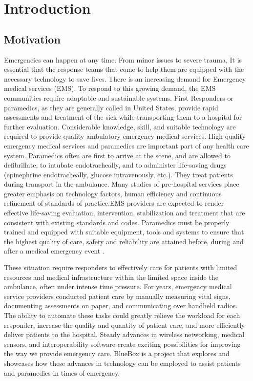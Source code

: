 \chapter{Introduction}
\section{Motivation}
\hspace{10mm} Emergencies can happen at any time. From minor issues to severe trauma, It is essential that the response teams that come to help them are equipped with the necessary technology to save lives. There is an increasing demand for Emergency medical services (EMS). To respond to this growing demand, the EMS communities require adaptable and sustainable systems. First Responders or paramedics, as they are generally called in United States, provide rapid assessments and treatment of the sick while transporting them to a hospital for further evaluation. Considerable knowledge, skill, and suitable technology are required to provide quality ambulatory emergency medical services. High quality emergency medical services and paramedics are important part of any health care system. Paramedics often are first to arrive at the scene, and  are allowed to defibrillate, to intubate endotracheally, and to administer life-saving drugs (epinephrine endotracheally, glucose intravenously, etc.). They treat patients during transport in the ambulance. Many studies of pre-hospital services place greater emphasis on technology factors, human efficiency and continuous refinement of standards of practice.EMS providers are expected to render effective life-saving evaluation, intervention, stabilization and treatment that are consistent with existing standards and codes. Paramedics must be properly trained and equipped with suitable equipment, tools and systems to ensure that the highest quality of care, safety and reliability are attained before, during and after a medical emergency event \cite{EMS,EMS1,EMS2,EMS3}.

\hspace{10mm} These situation require responders to effectively care for patients with limited resources and medical infrastructure within the limited space inside the ambulance, often under intense time pressure. For years, emergency medical service providers conducted patient care by manually measuring vital signs, documenting assessments on paper, and communicating over handheld radios. The ability to automate these tasks could greatly relieve the workload for each responder, increase the quality and quantity of patient care, and more efficiently deliver patients to the hospital. 
Steady advances in wireless networking, medical sensors, and interoperability software create exciting possibilities for improving the way we provide emergency care. BlueBox is a project that explores and showcases how these advances in technology can be employed to assist patients and paramedics in times of emergency. 

